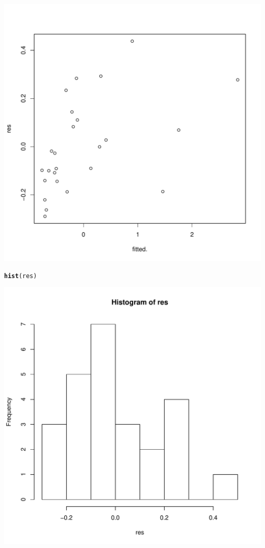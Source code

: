 \documentclass{article}\usepackage[]{graphicx}\usepackage[]{color}
\makeatletter
\def\maxwidth{ %
  \ifdim\Gin@nat@width>\linewidth
    \linewidth
  \else
    \Gin@nat@width
  \fi
}
\newcommand{\hlstd}[1]{\textcolor[rgb]{0.345,0.345,0.345}{#1}}%
\newcommand{\hlkwd}[1]{\textcolor[rgb]{0.737,0.353,0.396}{\textbf{#1}}}%
\newenvironment{kframe}{%
 \def\at@end@of@kframe{}%
 \ifinner\ifhmode%
  \def\at@end@of@kframe{\end{minipage}}%
  \begin{minipage}{\columnwidth}%
 \fi\fi%
 \def\FrameCommand##1{\hskip\@totalleftmargin \hskip-\fboxsep
 \colorbox{shadecolor}{##1}\hskip-\fboxsep
     \hskip-\linewidth \hskip-\@totalleftmargin \hskip\columnwidth}%
 \MakeFramed {\advance\hsize-\width
   \@totalleftmargin\z@ \linewidth\hsize
   \@setminipage}}%
 {\par\unskip\endMakeFramed%
 \at@end@of@kframe}
\newenvironment{knitrout}{}{} %
\makeatother
\begin{document}
\begin{enumerate}[(a)]
\begin{knitrout}
\includegraphics[width=\maxwidth]{figure/unnamed-chunk-9-2} 
\begin{kframe}\begin{alltt}
  \hlkwd{hist}\hlstd{(res)}
\end{alltt}
\end{kframe}
\includegraphics[width=\maxwidth]{figure/unnamed-chunk-9-3} 


\end{knitrout}
\end{enumerate}
\end{document}
